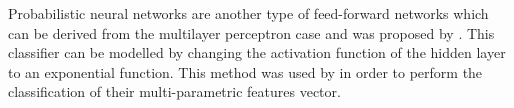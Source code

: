 \begin{enumerate}[leftmargin=*]
%   
%   
%   				
%   		
%   		
%  

Probabilistic neural networks are another type of feed-forward networks which can be derived from the multilayer perceptron case and was proposed by \cite{Specht1988}. This classifier can be modelled by changing the activation function of the hidden layer to an exponential function. %
%
%
This method was used  by \cite{Ampeliotis2007,Ampeliotis2008,Viswanath2011} in order to perform the classification of their multi-parametric features vector.


\end{enumerate}
